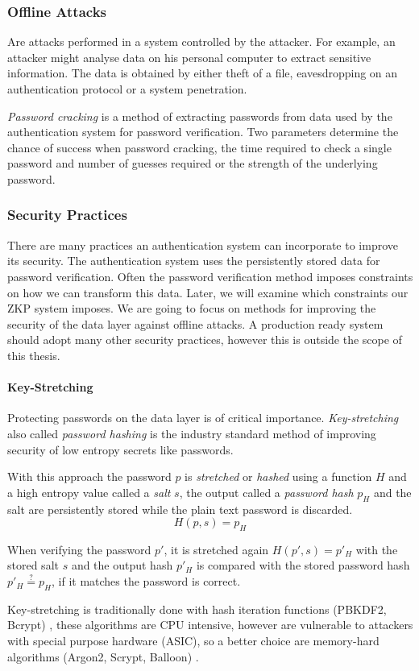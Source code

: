 \subsubsection{Offline Attacks}
Are attacks performed in a system controlled by the attacker.
For example, an attacker might analyse data on his personal computer to extract sensitive information.
The data is obtained by either theft of a file, eavesdropping on an authentication protocol or a system penetration.

\textit{Password cracking} \cite{blocki2018economics} is a method of extracting passwords from data used by the authentication system for password verification.
Two parameters determine the chance of success when password cracking, the time required to check a single password and number of guesses required or the strength of the underlying password.


\subsubsection{Security Practices}
\label{password-security-practices}
There are many practices an authentication system can incorporate to improve its security.
The authentication system uses the persistently stored data for password verification. Often the password verification method imposes constraints on how we can transform this data. Later, we will examine which constraints our ZKP system imposes.
We are going to focus on methods for improving the security of the data layer against offline attacks.
A production ready system should adopt many other security practices, however this is outside the scope of this thesis.

\paragraph{Key-Stretching}
\label{paragraph:password-hashing}
Protecting passwords on the data layer is of critical importance.
\textit{Key-stretching} \cite{hornby2016salted} also called \textit{password hashing} is the industry standard method of improving security of low entropy secrets like passwords.

With this approach the password $p$ is \textit{stretched} or \textit{hashed} using a function $H$ and a high entropy value called a \textit{salt} $s$, the output called a \textit{password hash} $p_H$ and the salt are persistently stored while the plain text password is discarded.
$$H(p, s) = p_H$$

When verifying the password $p'$, it is stretched again $H(p', s) = p{'}_H$ with the stored salt $s$ and the output hash $p{'}_H$ is compared with the stored password hash $p{'}_H \stackrel{?}{=} p_H$, if it matches the password is correct.

Key-stretching \cite{blocki2018economics} is traditionally done with hash iteration functions (PBKDF2, Bcrypt) \cite{kaliski2000pkcs, provos1999bcrypt}, these algorithms are CPU intensive, however are vulnerable to attackers with special purpose hardware (ASIC), so a better choice are memory-hard algorithms (Argon2, Scrypt, Balloon) \cite{biryukov2016argon2, percival2016scrypt, boneh2016balloon}.